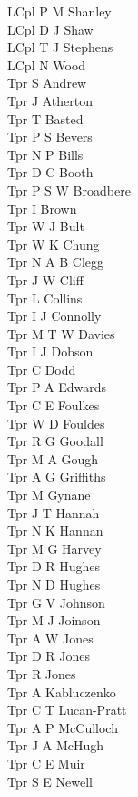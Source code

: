 \begin{multicols}{2}
  LCpl P M Shanley \\
  LCpl D J Shaw \\
  LCpl T J Stephens \\
  LCpl N Wood \\
  Tpr S Andrew \\
  Tpr J Atherton \\
  Tpr T Basted \\
  Tpr P S Bevers \\
  Tpr N P Bills \\
  Tpr D C Booth \\
  Tpr P S W Broadbere \\
  Tpr I Brown \\
  Tpr W J Bult \\
  Tpr W K Chung \\
  Tpr N A B Clegg \\
  Tpr J W Cliff \\
  Tpr L Collins \\
  Tpr I J Connolly \\
  Tpr M T W Davies \\
  Tpr I J Dobson \\
  Tpr C Dodd \\
  Tpr P A Edwards \\
  Tpr C E Foulkes \\
  Tpr W D Fouldes \\
  Tpr R G Goodall \\
  Tpr M A Gough \\
  Tpr A G Griffiths \\
  Tpr M Gynane \\
  Tpr J T Hannah \\
  Tpr N K Hannan \\
  Tpr M G Harvey \\
  Tpr D R Hughes \\
  Tpr N D Hughes \\
  Tpr G V Johnson \\
  Tpr M J Joinson \\
  Tpr A W Jones \\
  Tpr D R Jones \\
  Tpr R Jones \\
  Tpr A Kabluczenko \\
  Tpr C T Lucan-Pratt \\
  Tpr A P McCulloch \\
  Tpr J A McHugh \\
  Tpr C E Muir \\
  Tpr S E Newell \\

\end{multicols}
